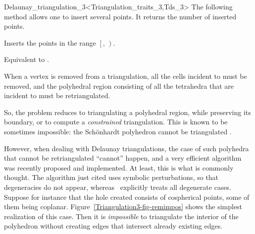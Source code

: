 \begin{ccRefClass}{Delaunay_triangulation_3<Triangulation_traits_3,Tds_3>}
The following method allows one to insert several points. It returns the
number of inserted points. 

{Inserts the points in the range $\left[\right.$,
$\left.\right)$. 
}

{Equivalent to .}


When a vertex  is removed from a triangulation, all the cells
incident to  must be removed, and the polyhedral region
consisting of all the tetrahedra that are incident to  must be
retriangulated. 

So, the problem reduces to triangulating a polyhedral
region, while preserving its boundary, or to compute a
\textit{constrained} triangulation. This is known to be sometimes
impossible: the Sch\"onhardt polyhedron cannot be triangulated
\cite{s-cgehd-98}. 

However, when dealing with Delaunay triangulations, the case of such
polyhedra that cannot be retriangulated ``cannot'' happen, and a very
efficient algorithm was recently proposed \cite{d-ddt-99} and
implemented. At least, this is what is commonly thought. The algorithm 
just cited uses symbolic perturbations, so that degeneracies do not
appear, whereas \cgal\ explicitly treats all degenerate cases.
Suppose for instance that the hole created consists of cospherical
points, some of them being coplanar.
Figure~\ref{Triangulation3-fig-remimpos} shows the simplest
realization of this case. Then it is \textit{impossible} to
triangulate the interior of the polyhedron without creating edges that
intersect already existing edges.


\end{ccRefClass}
